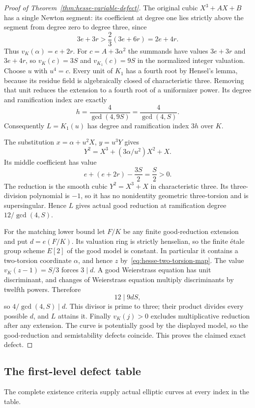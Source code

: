 \begin{proof}[Proof of Theorem~\ref{thm:hesse-variable-defect}]
The original cubic $X^3+AX+B$ has a single Newton segment: its coefficient at degree one lies strictly above the segment from degree zero to degree three, since
\[
                    3e+3r>\frac23(3e+6r)=2e+4r.
\]
Thus $v_K(\alpha)=e+2r$. For $c=A+3\alpha^2$ the summands have values $3e+3r$ and $3e+4r$, so $v_K(c)=3S$ and $v_{K_1}(c)=9S$ in the normalized integer valuation. Choose $u$ with $u^4=c$. Every unit of $K_1$ has a fourth root by Hensel's lemma, because its residue field is algebraically closed of characteristic three. Removing that unit reduces the extension to a fourth root of a uniformizer power. Its degree and ramification index are exactly
\[
                     h=\frac4{\gcd(4,9S)}=\frac4{\gcd(4,S)}.
\]
Consequently $L=K_1(u)$ has degree and ramification index $3h$ over $K$.

The substitution $x=\alpha+u^2X$, $y=u^3Y$ gives
\[
                      Y^2=X^3+(3\alpha/u^2)X^2+X.
\]
Its middle coefficient has value
\[
                    e+(e+2r)-\frac{3S}{2}=\frac S2>0.
\]
The reduction is the smooth cubic $Y^2=X^3+X$ in characteristic three. Its three-division polynomial is $-1$, so it has no nonidentity geometric three-torsion and is supersingular. Hence $L$ gives actual good reduction at ramification degree $12/\gcd(4,S)$.

For the matching lower bound let $F/K$ be any finite good-reduction extension and put $d=e(F/K)$. Its valuation ring is strictly henselian, so the finite \'etale group scheme $E[2]$ of the good model is constant. In particular it contains a two-torsion coordinate $\alpha$, and hence $z$ by~\eqref{eq:hesse-two-torsion-map}. The value $v_K(z-1)=S/3$ forces $3\mid d$. A good Weierstrass equation has unit discriminant, and changes of Weierstrass equation multiply discriminants by twelfth powers. Therefore
\[
                         12\mid9dS,
\]
so $4/\gcd(4,S)\mid d$. This divisor is prime to three; their product divides every possible $d$, and $L$ attains it. Finally $v_K(j)>0$ excludes multiplicative reduction after any extension. The curve is potentially good by the displayed model, so the good-reduction and semistability defects coincide. This proves the claimed exact defect.
\end{proof}

\subsection{The first-level defect table}
The complete existence criteria supply actual elliptic curves at every index in the table.

